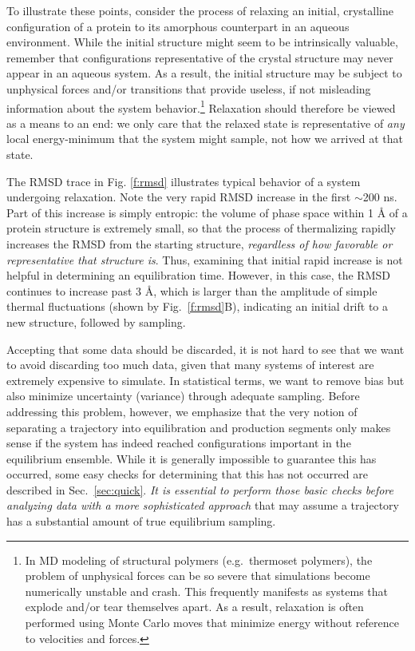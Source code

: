 To illustrate these points, consider the process of relaxing an initial, crystalline configuration of a protein to its amorphous counterpart in an aqueous environment.
While the initial structure might seem to be intrinsically valuable, remember that configurations representative of the crystal structure may never appear in an aqueous system.
As a result, the initial structure may be subject to unphysical forces and/or transitions that provide useless, if not misleading information about the system behavior.\footnote{In MD modeling of structural polymers (e.g.\ thermoset polymers), the problem of unphysical forces can be so severe that simulations become numerically unstable and crash.  This frequently manifests as systems that explode and/or tear themselves apart.  As a result, relaxation is often performed using Monte Carlo moves that minimize energy without reference to velocities and forces.}
Relaxation should therefore be viewed as a means to an end: we only care that the relaxed state is representative of {\it any} local energy-minimum that the system might sample, not how we arrived at that state.

The RMSD trace in Fig. \ref{f:rmsd} illustrates typical behavior of a system undergoing relaxation.  Note the very rapid RMSD increase in the first $\sim$200 ns. Part of this increase is simply entropic: the volume of phase space within 1 {\AA} of a protein structure is extremely small, so that the process of thermalizing rapidly increases the RMSD from the starting structure, \emph{regardless of how favorable or representative that structure is}.  Thus, examining that initial rapid increase is not helpful in determining an equilibration time.  However, in this case, the RMSD continues to increase past 3 {\AA}, which is larger than the amplitude of simple thermal fluctuations (shown by Fig.\ \ref{f:rmsd}B), indicating an initial drift to a new structure, followed by sampling.

Accepting that some data should be discarded, it is not hard to see that we want to avoid discarding too much data, given that many systems of interest are extremely expensive to simulate.  In statistical terms, we want to remove bias but also minimize uncertainty (variance) through adequate sampling.  Before addressing this problem, however, we emphasize that the very notion of separating a trajectory into equilibration and production segments only makes sense if the system has indeed reached configurations important in the equilibrium ensemble. While it is generally impossible to guarantee this has occurred, some easy checks for determining that this has not occurred are described in Sec.\ \ref{sec:quick}. \emph{It is essential to perform those basic checks before analyzing data with a more sophisticated approach} that may assume a trajectory has a substantial amount of true equilibrium sampling.

